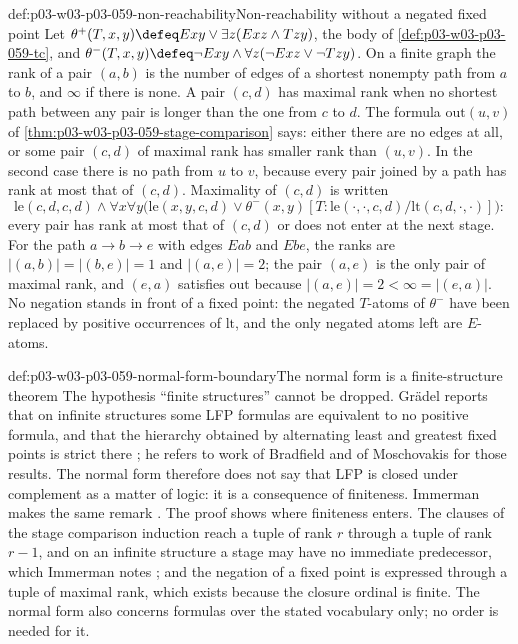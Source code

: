 \begin{hbexample}{def:p03-w03-p03-059-non-reachability}{Non-reachability without a negated fixed point}
Let \(\theta^+(T,x,y)\defeq Exy\lor\exists z(Exz\land Tzy)\), the body of
\cref{def:p03-w03-p03-059-tc}, and
\(\theta^-(T,x,y)\defeq\neg Exy\land\forall z(\neg Exz\lor\neg Tzy)\). On a
finite graph the rank of a pair \((a,b)\) is the number of edges of a
shortest nonempty path from \(a\) to \(b\), and \(\infty\) if there is
none. A pair \((c,d)\) has maximal rank when no shortest path between any
pair is longer than the one from \(c\) to \(d\). The formula
\(\mathrm{out}(u,v)\) of \cref{thm:p03-w03-p03-059-stage-comparison} says:
either there are no edges at all, or some pair \((c,d)\) of maximal rank
has smaller rank than \((u,v)\). In the second case there is no path from
\(u\) to \(v\), because every pair joined by a path has rank at most that
of \((c,d)\). Maximality of \((c,d)\) is written
\[
 \mathrm{le}(c,d,c,d)\land\forall x\forall y\bigl(\mathrm{le}(x,y,c,d)\lor
 \theta^-(x,y)[T:\mathrm{le}(\cdot,\cdot,c,d)/\mathrm{lt}(c,d,\cdot,\cdot)]\bigr):
\]
every pair has rank at most that of \((c,d)\) or does not enter at the next
stage. For the path \(a\to b\to e\) with edges \(Eab\) and \(Ebe\), the
ranks are \(|(a,b)|=|(b,e)|=1\) and \(|(a,e)|=2\); the pair \((a,e)\) is the
only pair of maximal rank, and \((e,a)\) satisfies \(\mathrm{out}\) because
\(|(a,e)|=2<\infty=|(e,a)|\). No negation stands in front of a fixed point:
the negated \(T\)-atoms of \(\theta^-\) have been replaced by positive
occurrences of \(\mathrm{lt}\), and the only negated atoms left are
\(E\)-atoms.
\end{hbexample}

\begin{hbwarning}{def:p03-w03-p03-059-normal-form-boundary}{The normal form is a finite-structure theorem}
The hypothesis ``finite structures'' cannot be dropped. Gr\"adel reports
that on infinite structures some LFP formulas are equivalent to no positive
formula, and that the hierarchy obtained by alternating least and greatest
fixed points is strict there \cite[p.~176]{Gradel2007FMTDescriptiveChapter}; he refers to
work of Bradfield and of Moschovakis for those results. The normal form
therefore does not say that LFP is closed under complement as a matter of
logic: it is a consequence of finiteness. Immerman makes the same remark
\cite[p.~100]{Immerman1986}. The proof shows where finiteness enters. The
clauses of the stage comparison induction reach a tuple of rank \(r\) through
a tuple of rank \(r-1\), and on an infinite structure a stage may have no
immediate predecessor, which Immerman notes \cite[pp.~97--98]{Immerman1986};
and the negation of a fixed point is expressed through a tuple of maximal
rank, which exists because the closure ordinal is finite. The normal form
also concerns formulas over the stated vocabulary only; no order is needed
for it.
\end{hbwarning}

